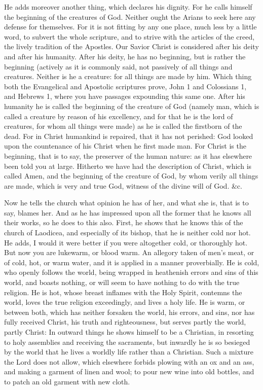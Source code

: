 He adds moreover another thing, which declares his dignity. For he calls himself the beginning of the creatures of God. Neither ought the Arians to seek here any defense for themselves. For it is not fitting by any one place, much less by a little word, to subvert the whole scripture, and to strive with the articles of the creed, the lively tradition of the Apostles. Our Savior Christ is considered after his deity and after his humanity. After his deity, he has no beginning, but is rather the beginning (actively as it is commonly said, not passively of all things and creatures. Neither is he a creature: for all things are made by him. Which thing both the Evangelical and Apostolic scriptures prove, John 1 and Colossians 1, and Hebrews 1, where you have passages expounding this same one. After his humanity he is called the beginning of the creature of God (namely man, which is called a creature by reason of his excellency, and for that he is the lord of creatures, for whom all things were made) as he is called the firstborn of the dead. For in Christ humankind is repaired, that it has not perished: God looked upon the countenance of his Christ when he first made man. For Christ is the beginning, that is to say, the preserver of the human nature: as it has elsewhere been told you at large. Hitherto we have had the description of Christ, which is called Amen, and the beginning of the creature of God, by whom verily all things are made, which is very and true God, witness of the divine will of God. \&c.

Now he tells the church what opinion he has of her, and what she is, that is to say, blames her. And as he has impressed upon all the former that he knows all their works, so he does to this also. First, he shows that he knows this of the church of Laodicea, and especially of its bishop, that he is neither cold nor hot. He adds, I would it were better if you were altogether cold, or thoroughly hot. But now you are lukewarm, or blood warm. An allegory taken of men’s meat, or of cold, hot, or warm water, and it is applied in a manner proverbially. He is cold, who openly follows the world, being wrapped in heathenish errors and sins of this world, and boasts nothing, or will seem to have nothing to do with the true religion. He is hot, whose breast inflames with the Holy Spirit, contemns the world, loves the true religion exceedingly, and lives a holy life. He is warm, or between both, which has neither forsaken the world, his errors, and sins, nor has fully received Christ, his truth and righteousness, but serves partly the world, partly Christ: In outward things he shows himself to be a Christian, in resorting to holy assemblies and receiving the sacraments, but inwardly he is so besieged by the world that he lives a worldly life rather than a Christian. Such a mixture the Lord does not allow, which elsewhere forbids plowing with an ox and an ass, and making a garment of linen and wool; to pour new wine into old bottles, and to patch an old garment with new cloth.

